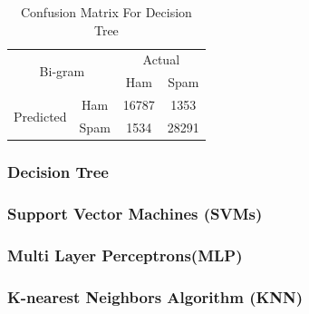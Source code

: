 \documentclass[12pt]{article}
\begin{document}
\begin{table}[H]
\begin{floatrow}
{\begin{subtable}{.45\textwidth}
								\begin{tabular}{@{}|c|c|c|c|@{}}
										\toprule
										\multicolumn{2}{|c|}{\multirow{2}{*}{Bi-gram}} & \multicolumn{2}{c|}{Actual} \\ \cmidrule(l){3-4} 
										\multicolumn{2}{|c|}{}                        & Ham          & Spam         \\ \midrule
										\multirow{2}{*}{Predicted}       & Ham        & 16787        & 1353         \\ \cmidrule(l){2-4} 
										& Spam       & 1534         & 28291        \\ \bottomrule
									\end{tabular}
							\end{subtable}
					}{  
						\caption{Confusion Matrix For Decision Tree}  
						\label{Confusion_DT}  
					}  
			\end{floatrow}
	\end{table} 


\subsubsection{Decision Tree}




\subsubsection{Support Vector Machines (SVMs)}


\subsubsection{Multi Layer Perceptrons(MLP)}



\subsubsection{K-nearest Neighbors Algorithm (KNN)}

\end{document}
